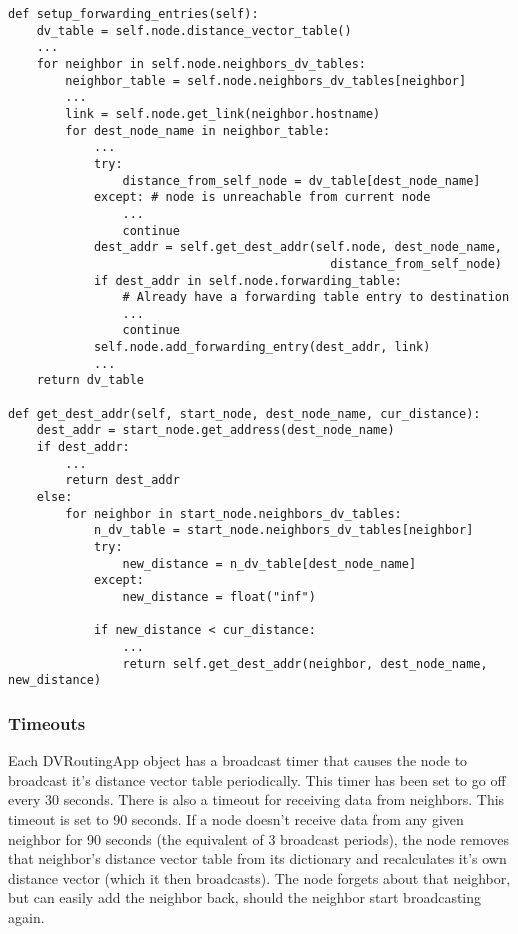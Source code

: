 \documentclass[11pt]{article}
\begin{document}
\begin{lstlisting}
def setup_forwarding_entries(self):
    dv_table = self.node.distance_vector_table()
    ...
    for neighbor in self.node.neighbors_dv_tables:
        neighbor_table = self.node.neighbors_dv_tables[neighbor]
        ...
        link = self.node.get_link(neighbor.hostname)
        for dest_node_name in neighbor_table:
            ...
            try:
                distance_from_self_node = dv_table[dest_node_name]
            except: # node is unreachable from current node
                ...
                continue
            dest_addr = self.get_dest_addr(self.node, dest_node_name, 
                                             distance_from_self_node)
            if dest_addr in self.node.forwarding_table:
                # Already have a forwarding table entry to destination
                ...
                continue
            self.node.add_forwarding_entry(dest_addr, link)
            ...
    return dv_table

def get_dest_addr(self, start_node, dest_node_name, cur_distance):
    dest_addr = start_node.get_address(dest_node_name)
    if dest_addr:
        ...
        return dest_addr
    else:
        for neighbor in start_node.neighbors_dv_tables:
            n_dv_table = start_node.neighbors_dv_tables[neighbor]
            try:
                new_distance = n_dv_table[dest_node_name]
            except:
                new_distance = float("inf")  

            if new_distance < cur_distance:
                ...
                return self.get_dest_addr(neighbor, dest_node_name, new_distance)
\end{lstlisting}

\subsubsection{Timeouts}
Each DVRoutingApp object has a broadcast timer that causes the node to broadcast it's distance vector table periodically. This timer has been set to go off every 30 seconds.
There is also a timeout for receiving data from neighbors. This timeout is set to 90 seconds. If a node doesn't receive data from any given neighbor for 90 seconds (the equivalent of 3 broadcast periods), the node removes that neighbor's distance vector table from its dictionary and recalculates it's own distance vector (which it then broadcasts). The node forgets about that neighbor, but can easily add the neighbor back, should the neighbor start broadcasting again.
\end{document}
